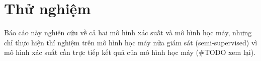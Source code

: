 \section{Thử nghiệm}
Báo cáo này nghiên cứu về cả hai mô hình xác suất và mô hình học máy, nhưng
chỉ thực hiện thí nghiệm trên mô hình học máy nửa giám sát (semi-supervised) vì
mô hình xác suất cần trực tiếp kết quả của mô hình học máy (\#TODO xem lại).

\label{sec:experiments}
